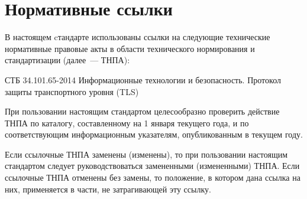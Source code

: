 \chapter{Нормативные ссылки}\label{Refs}

В настоящем cтандарте использованы ссылки на следующие 
технические нормативные правовые акты в области 
технического нормирования и стандартизации (далее~--- ТНПА):

СТБ 34.101.65-2014 Информационные технологии и безопасность. Протокол защиты 
транспортного уровня (TLS)

\begin{note*}
При пользовании настоящим стандартом целесообразно 
проверить действие ТНПА по каталогу,
составленному на 1 января текущего года, и по соответствующим 
информационным указателям, опубликованным в текущем году.

Если ссылочные ТНПА заменены (изменены), то при пользовании настоящим 
стандартом следует руководствоваться замененными (измененными) ТНПА. 
Если ссылочные ТНПА отменены без замены, то положение, в котором 
дана ссылка на них, применяется в части, не затрагивающей эту ссылку.
\end{note*}


